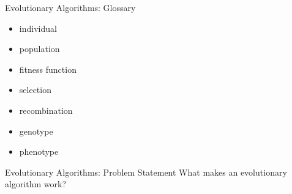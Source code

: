 \begin{frame}{Evolutionary Algorithms: Glossary}
\begin{itemize}
  \item individual
  \item population
  \item fitness function
  \item selection
  \item recombination
  \item genotype
  \item phenotype
\end{itemize}
\end{frame}

\begin{frame}{Evolutionary Algorithms: Problem Statement}
  What makes an evolutionary algorithm work?
\end{frame}
